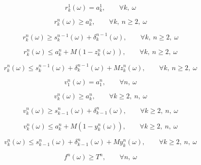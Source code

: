 \documentclass[10pt]{article}
\begin{document}
\begin{equation}
r_k^1(\omega) = a_k^1,
\qquad \forall k,\ \omega
\tag{13a}
\end{equation}

\begin{equation}
r_k^n(\omega) \ge a_k^n,
\qquad \forall k,\ n \ge 2,\ \omega
\tag{13b}
\end{equation}

\begin{equation}
r_k^n(\omega) \ge s_k^{n-1}(\omega) + \delta_k^{n-1}(\omega),
\qquad \forall k,\ n \ge 2,\ \omega
\tag{14}
\end{equation}

\begin{equation}
r_k^n(\omega) \le a_k^n + M(1-z_k^n(\omega)),
\qquad \forall k,\ n \ge 2,\ \omega
\tag{15}
\end{equation}

\begin{equation}
r_k^n(\omega) \le s_k^{n-1}(\omega) + \delta_k^{n-1}(\omega) + M z_k^n(\omega),
\qquad \forall k,\ n \ge 2,\ \omega
\tag{16}
\end{equation}

\begin{equation}
v_1^n(\omega) = a_1^n,
\qquad \forall n,\ \omega
\tag{17}
\end{equation}

\begin{equation}
v_k^n(\omega) \ge a_k^n,
\qquad \forall k \ge 2,\ n,\ \omega
\tag{18}
\end{equation}

\begin{equation}
v_k^n(\omega) \ge s_{k-1}^n(\omega) + \delta_{k-1}^n(\omega),
\qquad \forall k \ge 2,\ n,\ \omega
\tag{19}
\end{equation}

\begin{equation}
v_k^n(\omega) \le a_k^n + M(1-y_k^n(\omega)),
\qquad \forall k \ge 2,\ n,\ \omega
\tag{20}
\end{equation}

\begin{equation}
v_k^n(\omega) \le s_{k-1}^n(\omega) + \delta_{k-1}^n(\omega) + M y_k^n(\omega),
\qquad \forall k \ge 2,\ n,\ \omega
\tag{21}
\end{equation}

\begin{equation}
f^n(\omega) \ge T^n,
\qquad \forall n,\ \omega
\tag{22}
\end{equation}
\end{document}
